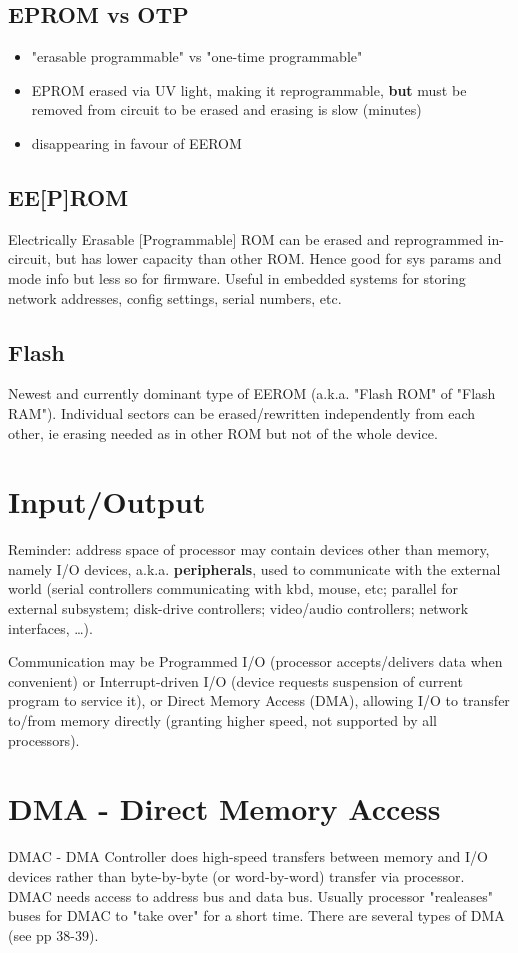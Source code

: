\documentclass[11pt]{article}
\begin{document}
\subsection{EPROM vs OTP}
\label{sec:orgef9e624}
\begin{itemize}
\item "erasable programmable" vs "one-time programmable"
\item EPROM erased via UV light, making it reprogrammable, \textbf{but} must be removed
from circuit to be erased and erasing is slow (minutes)
\item disappearing in favour of EEROM
\end{itemize}
\subsection{EE[P]ROM}
\label{sec:org806a09a}
Electrically Erasable [Programmable] ROM can be erased and reprogrammed
in-circuit, but has lower capacity than other ROM. Hence good for sys params
and mode info but less so for firmware. Useful in embedded systems for
storing network addresses, config settings, serial numbers, etc.
\subsection{Flash}
\label{sec:org6f59b4f}
Newest and currently dominant type of EEROM (a.k.a. "Flash ROM" of "Flash
RAM").
Individual sectors can be erased/rewritten independently from each other, ie
erasing needed as in other ROM but not of the whole device.

\section{Input/Output}
\label{sec:org2f8dd67}
Reminder: address space of processor may contain devices other than memory,
namely I/O devices, a.k.a. \textbf{\textbf{peripherals}}, used to communicate with the
external world (serial controllers communicating with kbd, mouse, etc;
parallel for external subsystem; disk-drive controllers; video/audio
controllers; network interfaces, \ldots{}).

Communication may be Programmed I/O (processor accepts/delivers data when
convenient) or Interrupt-driven I/O (device requests suspension of current
program to service it), or Direct Memory Access (DMA), allowing I/O to
transfer to/from memory directly (granting higher speed, not supported by all
processors).
\section{DMA - Direct Memory Access}
\label{sec:orgb17e405}
DMAC - DMA Controller does high-speed transfers between memory and I/O devices
rather than byte-by-byte (or word-by-word) transfer via processor.
DMAC needs access to address bus and data bus. Usually processor "realeases"
buses for DMAC to "take over" for a short time.
There are several types of DMA (see pp 38-39).
\end{document}
